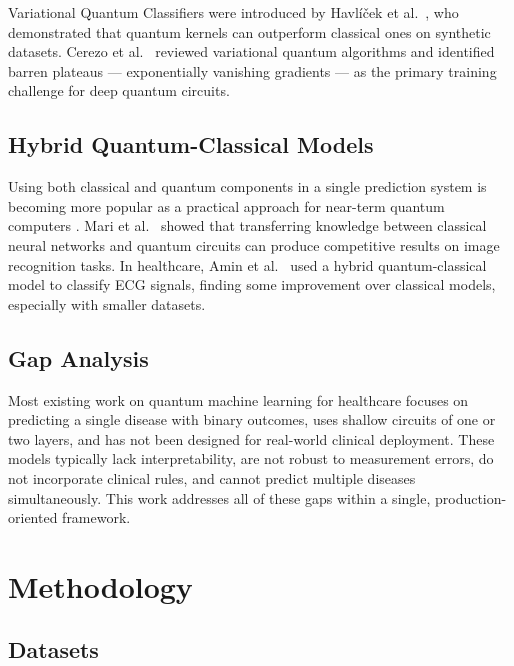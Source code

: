 ﻿\documentclass[conference]{IEEEtran}
\begin{document}
Variational Quantum Classifiers were introduced by Havl\'{i}\v{c}ek et al.\
\cite{havlicek2019supervised}, who demonstrated that quantum kernels can outperform
classical ones on synthetic datasets. Cerezo et al.\ \cite{cerezo2021vqa} reviewed
variational quantum algorithms and identified barren plateaus --- exponentially vanishing
gradients --- as the primary training challenge for deep quantum circuits.

\subsection{Hybrid Quantum-Classical Models}

Using both classical and quantum components in a single prediction system is becoming
more popular as a practical approach for near-term quantum computers \cite{mcclean2016vqe}.
Mari et al.\ \cite{mari2020transfer} showed that transferring knowledge between classical
neural networks and quantum circuits can produce competitive results on image recognition
tasks. In healthcare, Amin et al.\ \cite{amin2021quantum} used a hybrid quantum-classical
model to classify ECG signals, finding some improvement over classical models, especially
with smaller datasets.

\subsection{Gap Analysis}

Most existing work on quantum machine learning for healthcare focuses on predicting a
single disease with binary outcomes, uses shallow circuits of one or two layers, and has
not been designed for real-world clinical deployment. These models typically lack
interpretability, are not robust to measurement errors, do not incorporate clinical rules,
and cannot predict multiple diseases simultaneously. This work addresses all of these
gaps within a single, production-oriented framework.

\section{Methodology}
\label{sec:methodology}

\subsection{Datasets}
\end{document}
